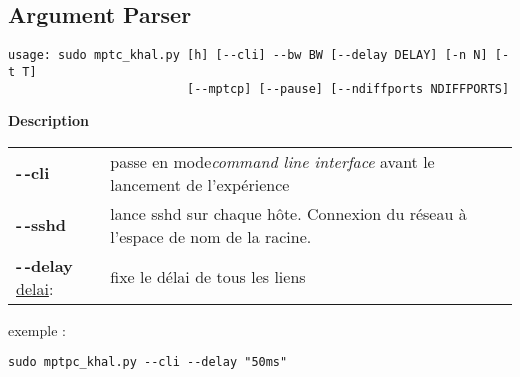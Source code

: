 \subsection{Argument Parser}
\label{sec:annexe1:mininetParserargs}

\begin{verbatim}
usage: sudo mptc_khal.py [h] [--cli] --bw BW [--delay DELAY] [-n N] [-t T]
                         [--mptcp] [--pause] [--ndiffports NDIFFPORTS]
\end{verbatim}

\textbf{\large Description}
\vspace{0.5cm}

\begin{tabular}{ll}
\textbf{-\,-cli}&passe en mode\emph{command line interface} avant le lancement de l'expérience\\
\textbf{-\,-sshd}&lance sshd sur chaque hôte. Connexion du réseau à l'espace de nom de la racine.\\
\textbf{-\,-delay} \uline{delai}:&fixe le délai de tous les liens\\

\end{tabular}

\vspace{1cm}
exemple :
\begin{verbatim}
sudo mptpc_khal.py --cli --delay "50ms"
\end{verbatim}